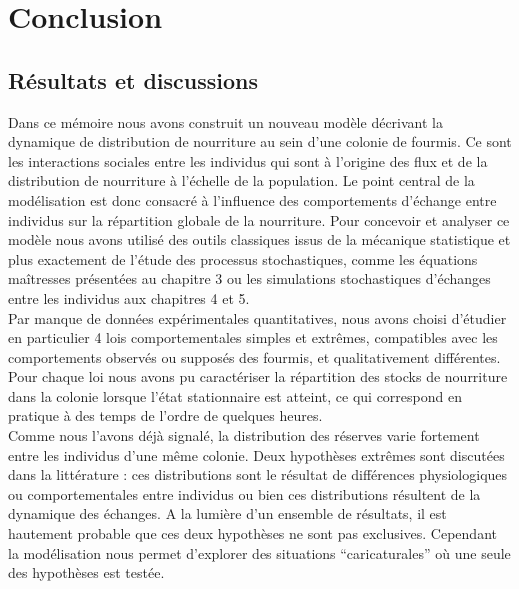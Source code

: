 \chapter{Conclusion}

\section{Résultats et discussions}


Dans ce mémoire nous avons construit un nouveau modèle décrivant la dynamique de distribution de nourriture au sein d'une colonie de fourmis. Ce sont les interactions sociales entre les individus qui sont à l'origine des flux et de la distribution de nourriture à l'échelle de la population. Le point central de la modélisation est donc consacré à l'influence des comportements d'échange entre individus sur la répartition globale de la nourriture. Pour concevoir et analyser ce modèle nous avons utilisé des outils classiques issus de la mécanique statistique et plus exactement de l'étude des processus stochastiques, comme les équations maîtresses présentées au chapitre 3 ou les simulations stochastiques d'échanges entre les individus aux chapitres 4 et 5. \\

Par manque de données expérimentales quantitatives, nous avons choisi d'étudier en particulier 4 lois comportementales simples et extrêmes, compatibles avec les comportements observés ou supposés des fourmis, et qualitativement différentes. Pour chaque loi nous avons pu caractériser la répartition des stocks de nourriture dans la colonie lorsque l'état stationnaire est atteint, ce qui correspond en pratique à des temps de l'ordre de quelques heures.\\

Comme nous l'avons déjà signalé, la distribution des réserves varie fortement entre les individus d'une même colonie. Deux hypothèses extrêmes sont discutées dans la littérature : ces distributions sont le résultat de différences physiologiques ou comportementales entre individus ou bien ces distributions résultent de la dynamique des échanges. A la lumière d'un ensemble de résultats, il est hautement probable que ces deux hypothèses ne sont pas exclusives. Cependant la modélisation nous permet d'explorer des situations ``caricaturales'' où une seule des hypothèses est testée.\\

